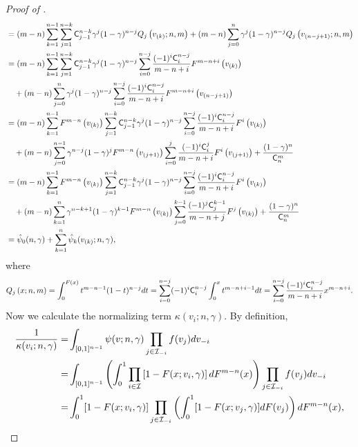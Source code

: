 \begin{proof}[Proof of ]
\begin{align*}
 & = (m-n)\sum_{k=1}^{n-1}  \sum_{j=1}^{n-k}\mathsf{C}^{n-k}_{j-1}\gamma^j
 (1-\gamma)^{n-j}Q_j\left(v_{(k)};n,m\right) + (m-n)\sum_{j=0}^n \gamma^j
 (1-\gamma)^{n-j}Q_j\left(v_{(n-j+1)};n,m\right)\\
 & = (m-n)\sum_{k=1}^{n-1}  \sum_{j=1}^{n-k}\mathsf{C}^{n-k}_{j-1}\gamma^j
 (1-\gamma)^{n-j}\sum_{i=0}^{n-j}\frac{(-1)^{i}\mathsf{C}^{n-j}_i}{m-n+i}F^{m-n+i}\left(v_{(k)}\right)\\
 & \quad + (m-n)\sum_{j=0}^n \gamma^j
 (1-\gamma)^{n-j}\sum_{i=0}^{n-j}\frac{(-1)^{i}\mathsf{C}^{n-j}_i}{m-n+i}F^{m-n+i}\left(v_{(n-j+1)}\right)\\
 & = (m-n)\sum_{k=1}^{n-1} F^{m-n}\left(v_{(k)}\right) \sum_{j=1}^{n-k}\mathsf{C}^{n-k}_{j-1}\gamma^j
 (1-\gamma)^{n-j}\sum_{i=0}^{n-j}\frac{(-1)^{i}\mathsf{C}^{n-j}_i}{m-n+i}F^{i}\left(v_{(k)}\right)\\
 & \quad + (m-n)\sum_{j=0}^{n-1} \gamma^{n-j}
 (1-\gamma)^{j}F^{m-n}\left(v_{(j+1)}\right)\sum_{i=0}^{j}\frac{(-1)^{i}\mathsf{C}^{j}_i}{m-n+i}F^{i}\left(v_{(j+1)}\right) + \frac{(1-\gamma)^n}{\mathsf{C}^{m}_n}\\
  & = (m-n)\sum_{k=1}^{n-1} F^{m-n} \left(v_{(k)}\right)\sum_{j=1}^{n-k}\mathsf{C}^{n-k}_{j-1}\gamma^j
 (1-\gamma)^{n-j}\sum_{i=0}^{n-j}\frac{(-1)^{i}\mathsf{C}^{n-j}_i}{m-n+i}F^{i}\left(v_{(k)}\right)\\
 & \quad + (m-n)\sum_{k=1}^{n} \gamma^{n-k+1}
 (1-\gamma)^{k-1}F^{m-n}\left(v_{(k)}\right)\sum_{j=0}^{k-1}\frac{(-1)^{j}\mathsf{C}^{k-1}_j}{m-n+j}F^{j}\left(v_{(k)}\right) + \frac{(1-\gamma)^n}{\mathsf{C}^{m}_n}\\
 &= \hat{\psi}_0(n,\gamma)+\sum_{k=1}^n \hat{\psi}_k(v_{(k)};n,\gamma),
  \end{align*}
where 
\begin{align*}
    Q_j\left(x;n,m\right) 
= \int_{0}^{F\left(x\right)} t^{m-n-1}(1-t)^{n-j}
 dt = \sum_{i=0}^{n-j}(-1)^{i}\mathsf{C}^{n-j}_i\int_{0}^xt^{m-n+i-1}dt = \sum_{i=0}^{n-j}\frac{(-1)^{i}\mathsf{C}^{n-j}_i}{m-n+i}x^{m-n+i}.
\end{align*}
Now we calculate the normalizing term $\kappa(v_i;n,\gamma)$. By definition,
\begin{align*}
 \frac{1}{\kappa(v_i;n,\gamma)} =& \int_{ [0,1]^{n-1}} \psi(v;n,\gamma) \prod_{j\in \mathcal{I}_{-i}} f(v_j) dv_{-i} \\
 =& \int_{ [0,1]^{n-1}}  \left(\int_0^1\prod_{i\in \mathcal{I}}\left[1-F(x;v_i,\gamma)\right] dF^{m-n}(x)\right)\prod_{j\in \mathcal{I}_{-i}} f(v_j) dv_{-i}\\
 =& \int_0^1 [1-F(x;v_i,\gamma)]\prod_{j\in \mathcal{I}_{-i}}\left(\int_0^1 [1-F(x;v_j,\gamma)]dF(v_j)\right)dF^{m-n}(x),
\end{align*}

\end{proof}
